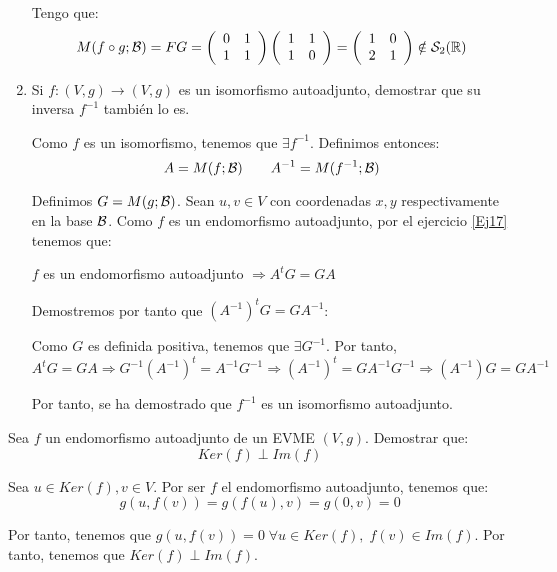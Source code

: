 \begin{ejercicio}
\begin{enumerate}
    Tengo que:
    \begin{equation*}
        M(f\circ g;\mathcal{B})=FG=\left(\begin{array}{cc}
            0 & 1 \\
            1 & 1
        \end{array}\right)
        \left(\begin{array}{cc}
            1 & 1 \\
            1 & 0
        \end{array}\right)
        =\left(\begin{array}{cc}
            1 & 0 \\
            2 & 1
        \end{array}\right)\notin \mathcal{S}_2(\mathbb{R})
    \end{equation*}


    \item Si $f:(V,g)\to (V,g)$ es un isomorfismo autoadjunto, demostrar que su inversa $f^{-1}$ también lo es.

    Como $f$ es un isomorfismo, tenemos que $\exists f^{-1}$. Definimos entonces:
    \begin{equation*}
        A=M(f;\mathcal{B}) \qquad 
        A^{-1}=M(f^{-1};\mathcal{B})
    \end{equation*}

    Definimos $G=M(g;\mathcal{B})$. Sean $u,v\in V$ con coordenadas $x,y$ respectivamente en la base $\mathcal{B}$. Como $f$ es un endomorfismo autoadjunto, por el ejercicio \ref{Ej17} tenemos que:
    \begin{center}
        $f$ es un endomorfismo autoadjunto $\Longrightarrow A^tG=GA$
    \end{center}

    Demostremos por tanto que $(A^{-1})^tG =GA^{-1}$:


    Como $G$ es definida positiva, tenemos que $\exists G^{-1}$. Por tanto,
    \begin{equation*}
        A^tG=GA \Longrightarrow G^{-1}(A^{-1})^t=A^{-1}G^{-1} \Longrightarrow \left(A^{-1}\right)^t=GA^{-1}G^{-1} \Longrightarrow \left(A^{-1}\right)G=GA^{-1}
    \end{equation*}

    Por tanto, se ha demostrado que $f^{-1}$ es un isomorfismo autoadjunto.
\end{enumerate}
\end{ejercicio}

\begin{ejercicio}
    Sea $f$ un endomorfismo autoadjunto de un EVME $(V,g)$. Demostrar que:
    \begin{equation*}
        Ker(f)\perp Im(f)
    \end{equation*}

    Sea $u\in Ker(f),v\in V$. Por ser $f$ el endomorfismo autoadjunto, tenemos que:
    \begin{equation*}
        g(u,f(v))=g(f(u),v)=g(0,v)=0
    \end{equation*}

    Por tanto, tenemos que $g(u,f(v))=0\;\forall u\in Ker(f),\;f(v)\in Im(f)$. Por tanto, tenemos que $Ker(f)\perp Im(f)$.
\end{ejercicio}

